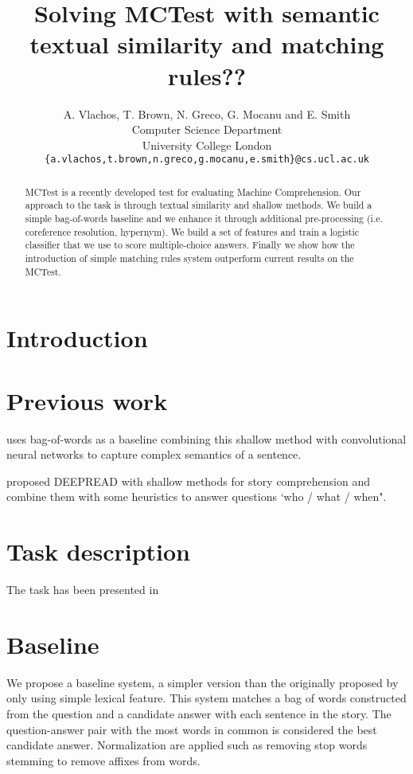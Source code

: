 \documentclass[11pt]{article}
\title{Solving MCTest with semantic textual similarity and matching rules??}
\author
       {A. Vlachos, T. Brown, N. Greco, G. Mocanu and E. Smith
       \\
       Computer Science Department\\
	University College London\\
       \tt{\{a.vlachos,t.brown,n.greco,g.mocanu,e.smith\}@cs.ucl.ac.uk}\\ 
       }
\date{}
\begin{document}
\maketitle
\begin{abstract}
MCTest is a recently developed test for evaluating Machine Comprehension.
Our approach to the task is through textual similarity and shallow methods.
We build a simple bag-of-words baseline and we enhance it through additional pre-processing (i.e. coreference resolution, hypernym).
We build a set of features and train a logistic classifier that we use to score multiple-choice answers.
Finally we show how the introduction of simple matching rules system outperform current results on the MCTest.
\end{abstract}

\section{Introduction}

\section{Previous work}

 uses bag-of-words as a baseline combining this shallow method with convolutional neural networks to capture complex semantics of a sentence.

 proposed D{\small EEP}R{\small EAD} with shallow methods for story comprehension and combine them with some heuristics to answer questions `who / what / when".

\section{Task description}

The task has been presented in  \cite{mctest}

\section{Baseline}
We propose a baseline system, a simpler version than the originally proposed by  only using simple lexical feature.
This system matches a bag of words constructed from the question and a candidate answer with each sentence in the story.
The question-answer pair with the most words in common is considered the best candidate answer.
Normalization are applied such as removing stop words stemming to remove affixes from words.
\end{document}
